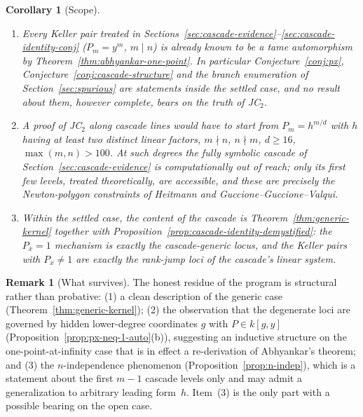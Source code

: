 \documentclass[12pt,a4paper]{article}
\newtheorem{corollary}[theorem]{Corollary}
\theoremstyle{definition}
\newtheorem{remark}[theorem]{Remark}
\newcommand{\kk}{k}
\begin{document}
\begin{corollary}[Scope]\label{cor:scope}
\leavevmode
\begin{enumerate}
\item[\textup{(i)}] Every Keller pair treated in
  Sections~\ref{sec:cascade-evidence}--\ref{sec:cascade-identity-conj}
  \textup{(}$P_m = y^m$, $m \mid n$\textup{)} is already known to be a tame
  automorphism by Theorem~\ref{thm:abhyankar-one-point}. In particular
  Conjecture~\ref{conj:px}, Conjecture~\ref{conj:cascade-structure} and
  the branch enumeration of Section~\ref{sec:spurious} are statements
  \emph{inside} the settled case, and no result about them, however
  complete, bears on the truth of JC$_2$.
\item[\textup{(ii)}] A proof of JC$_2$ along cascade lines would have to
  start from $P_m = h^{m/d}$ with $h$ having at least two distinct linear
  factors, $m \nmid n$, $n \nmid m$, $d \geq 16$, $\max(m,n) > 100$.
  At such degrees the fully symbolic cascade of
  Section~\ref{sec:cascade-evidence} is computationally out of reach;
  only its first few levels, treated theoretically, are accessible, and
  these are precisely the Newton-polygon constraints of
  Heitmann and Guccione--Guccione--Valqui.
\item[\textup{(iii)}] Within the settled case, the content of the
  cascade is Theorem~\ref{thm:generic-kernel} together with
  Proposition~\ref{prop:cascade-identity-demystified}: the $P_x = 1$
  mechanism is exactly the cascade-generic locus, and the Keller pairs
  with $P_x \neq 1$ are exactly the rank-jump loci of the cascade's
  linear system.
\end{enumerate}
\end{corollary}

\begin{remark}[What survives]
The honest residue of the program is structural rather than
probative: (1) a clean description of the generic case
(Theorem~\ref{thm:generic-kernel}); (2) the observation that the
degenerate loci are governed by hidden lower-degree coordinates
$g$ with $P \in \kk[g, y]$ (Proposition~\ref{prop:px-neq-1-auto}(b)),
suggesting an inductive structure on the one-point-at-infinity case that
is in effect a re-derivation of Abhyankar's theorem; and (3) the
$n$-independence phenomenon (Proposition~\ref{prop:n-indep}), which is a
statement about the first $m-1$ cascade levels only and may admit a
generalization to arbitrary leading form~$h$. Item~(3) is the only part
with a possible bearing on the open case.
\end{remark}
\end{document}
